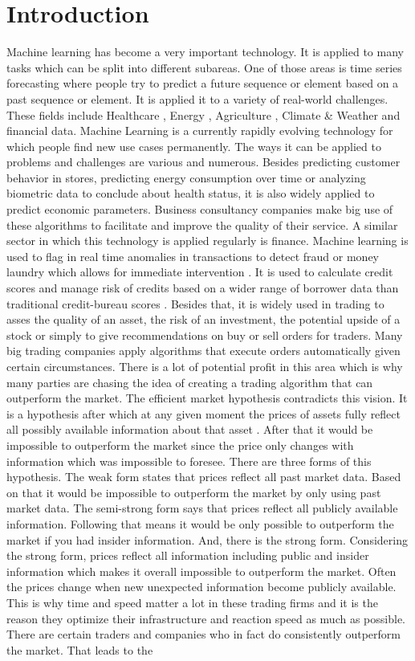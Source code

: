 \documentclass[a4paper,12pt]{report}
\begin{document}
\chapter{Introduction}
Machine learning has become a very important technology. It is applied to many tasks which can be split into different subareas. One of those areas is time series forecasting where people try to predict a future sequence or element based on a past sequence or element. It is applied it to a variety of real-world challenges. These fields include Healthcare \cite{1}, Energy \cite{2}, Agriculture \cite{3}, Climate \& Weather \cite{4} and financial data. Machine Learning is a currently rapidly evolving technology for which people find new use cases permanently. The ways it can be applied to problems and challenges are various and numerous. Besides predicting customer behavior in stores, predicting energy consumption over time or analyzing biometric data to conclude about health status, it is also widely applied to predict economic parameters. Business consultancy companies make big use of these algorithms to facilitate and improve the quality of their service. A similar sector in which this technology is applied regularly is finance. Machine learning is used to flag in real time anomalies in transactions to detect fraud or money laundry which allows for immediate intervention \cite{58}. It is used to calculate credit scores and manage risk of credits based on a wider range of borrower data than traditional credit-bureau scores \cite{59}. Besides that, it is widely used in trading to asses the quality of an asset, the risk of an investment, the potential upside of a stock or simply to give recommendations on buy or sell orders for traders. Many big trading companies apply algorithms that execute orders automatically given certain circumstances. There is a lot of potential profit in this area which is why many parties are chasing the idea of creating a trading algorithm that can outperform the market. The efficient market hypothesis contradicts this vision. It is a hypothesis after which at any given moment the prices of assets fully reflect all possibly available information about that asset \cite{60}. After that it would be impossible to outperform the market since the price only changes with information which was impossible to foresee. There are three forms of this hypothesis. The weak form states that prices reflect all past market data. Based on that it would be impossible to outperform the market by only using past market data. The semi-strong form says that prices reflect all publicly available information. Following that means it would be only possible to outperform the market if you had insider information. And, there is the strong form. Considering the strong form, prices reflect all information including public and insider information which makes it overall impossible to outperform the market. Often the prices change when new unexpected information become publicly available. This is why time and speed matter a lot in these trading firms and it is the reason they optimize their infrastructure and reaction speed as much as possible. There are certain traders and companies who in fact do consistently outperform the market. That leads to the 
\end{document}
